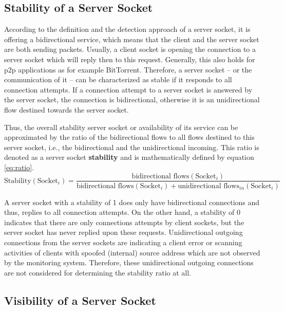 \subsection{Stability of a Server Socket}
According to the definition and the detection approach of a \gls{server socket}, it is offering a bidirectional service, which means that the client and the \gls{server socket} are both sending packets. 
Usually, a client socket is opening the connection to a \gls{server socket} which will reply then to this request. 
Generally, this also holds for \gls{p2p} applications as for example BitTorrent. Therefore, a \gls{server socket} -- or the communication of it -- can be characterized as stable if it responds to all connection attempts. 
If a connection attempt to a \gls{server socket} is answered by the \gls{server socket}, the connection is bidirectional, otherwise it is an unidirectional flow destined towards the \gls{server socket}.

Thus, the overall stability \gls{server socket} or availability of its service can be approximated by the ratio of the bidirectional flows to all flows destined to this \gls{server socket}, i.e., the bidirectional and the unidirectional incoming. 
This ratio is denoted as a \gls{server socket} \textbf{stability} and is mathematically defined by equation \ref{eq:ratio}.
\begin{equation}
	\text{Stability}(\text{Socket}_i) = \frac{\text{bidirectional flows}(\text{Socket}_i)}{\text{bidirectional flows}(\text{Socket}_i) + \text{unidirectional flows}_{in}(\text{Socket}_i)}
	\label{eq:ratio}
\end{equation}

A \gls{server socket} with a stability of 1 does only have bidirectional connections and thus, replies to all connection attempts. 
On the other hand, a stability of 0 indicates that there are only connections attempts by client sockets, but the \gls{server socket} has never replied upon these requests. 
Unidirectional outgoing connections from the \glspl{server socket} are indicating a client error or scanning activities of clients with spoofed (internal) source address which are not observed by the monitoring system. 
Therefore, these unidirectional outgoing connections are not considered for determining the stability ratio at all.

\subsection{Visibility of a Server Socket\label{subsection:visibility}}

